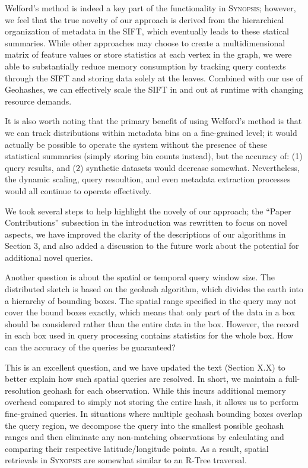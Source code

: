 \documentclass{article}
\begin{document}
\begin{tcolorbox}
    Welford's method is indeed a key part of the functionality in \textsc{Synopsis}; however, we feel that the true novelty of our approach is derived from the hierarchical organization of metadata in the SIFT, which eventually leads to these statical summaries. While other approaches may choose to create a multidimensional matrix of feature values or store statistics at each vertex in the graph, we were able to substantially reduce memory consumption by tracking query contexts through the SIFT and storing data solely at the leaves. Combined with our use of Geohashes, we can effectively scale the SIFT in and out at runtime with changing resource demands.

It is also worth noting that the primary benefit of using Welford's method is that we can track distributions within metadata bins on a fine-grained level; it would actually be possible to operate the system without the presence of these statistical summaries (simply storing bin counts instead), but the accuracy of: (1) query results, and (2) synthetic datasets would decrease somewhat. Nevertheless, the dynamic scaling, query resoultion, and even metadata extraction processes would all continue to operate effectively.

We took several steps to help highlight the novely of our approach; the ``Paper Contributions'' subsection in the introduction was rewritten to focus on novel aspects, we have improved the clarity of the descriptions of our algorithms in Section 3, and also added a discussion to the future work about the potential for additional novel queries.
\end{tcolorbox}

Another question is about the spatial or temporal query window size. The
distributed sketch is based on the geohash algorithm, which divides the
earth into a hierarchy of bounding boxes. The spatial range specified in
the query may not cover the bound boxes exactly, which means that only
part of the data in a box should be considered rather than the entire
data in the box. However, the record in each box used in query
processing contains statistics for the whole box. How can the accuracy
of the queries be guaranteed?

\begin{tcolorbox}
    This is an excellent question, and we have updated the text (Section X.X) to better explain how such spatial queries are resolved. In short, we maintain a full-resolution geohash for each observation. While this incurs additional memory overhead compared to simply not storing the entire hash, it allows us to perform fine-grained queries. In situations where multiple geohash bounding boxes overlap the query region, we decompose the query into the smallest possible geohash ranges and then eliminate any non-matching observations by calculating and comparing their respective latitude/longitude points. As a result, spatial retrievals in \textsc{Synopsis} are somewhat similar to an R-Tree \cite{guttman1984r} traversal.
\end{tcolorbox}
\end{document}
